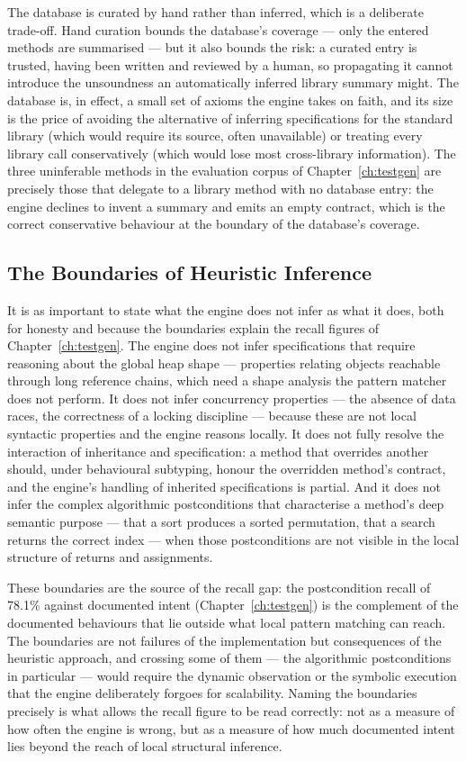 The database is curated by hand rather than inferred, which is a deliberate
trade-off. Hand curation bounds the database's coverage --- only the entered
methods are summarised --- but it also bounds the risk: a curated entry is
trusted, having been written and reviewed by a human, so propagating it cannot
introduce the unsoundness an automatically inferred library summary might. The
database is, in effect, a small set of axioms the engine takes on faith, and its
size is the price of avoiding the alternative of inferring specifications for the
standard library (which would require its source, often unavailable) or treating
every library call conservatively (which would lose most cross-library
information). The three uninferable methods in the evaluation corpus of
Chapter~\ref{ch:testgen} are precisely those that delegate to a library method
with no database entry: the engine declines to invent a summary and emits an empty
contract, which is the correct conservative behaviour at the boundary of the
database's coverage.

\subsection{The Boundaries of Heuristic Inference}

It is as important to state what the engine does not infer as what it does, both
for honesty and because the boundaries explain the recall figures of
Chapter~\ref{ch:testgen}. The engine does not infer specifications that require
reasoning about the global heap shape --- properties relating objects reachable
through long reference chains, which need a shape analysis the pattern matcher does
not perform. It does not infer concurrency properties --- the absence of data
races, the correctness of a locking discipline --- because these are not local
syntactic properties and the engine reasons locally. It does not fully resolve the
interaction of inheritance and specification: a method that overrides another
should, under behavioural subtyping, honour the overridden method's contract, and
the engine's handling of inherited specifications is partial. And it does not infer
the complex algorithmic postconditions that characterise a method's deep semantic
purpose --- that a sort produces a sorted permutation, that a search returns the
correct index --- when those postconditions are not visible in the local structure
of returns and assignments.

These boundaries are the source of the recall gap: the postcondition recall of
78.1\% against documented intent (Chapter~\ref{ch:testgen}) is the complement of
the documented behaviours that lie outside what local pattern matching can reach.
The boundaries are not failures of the implementation but consequences of the
heuristic approach, and crossing some of them --- the algorithmic postconditions
in particular --- would require the dynamic observation or the symbolic execution
that the engine deliberately forgoes for scalability. Naming the boundaries
precisely is what allows the recall figure to be read correctly: not as a measure
of how often the engine is wrong, but as a measure of how much documented intent
lies beyond the reach of local structural inference.

